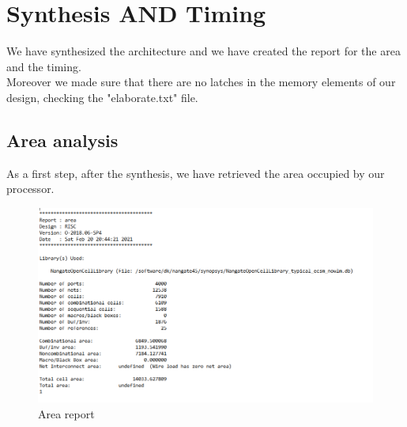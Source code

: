 \chapter{Synthesis AND Timing}
We have synthesized the architecture and we have created the report for the area and the timing.\\
Moreover we made sure that there are no latches in the memory elements of our design, checking the "elaborate.txt" file.
\section{Area analysis}
As a first step, after the synthesis, we have retrieved the area occupied by our processor.
\begin{figure}[h!]
	\centering
	\includegraphics[width=20cm]{./images/RISC_area}
	\caption{Area report}
	\label{fig5.1}
\end{figure} 
